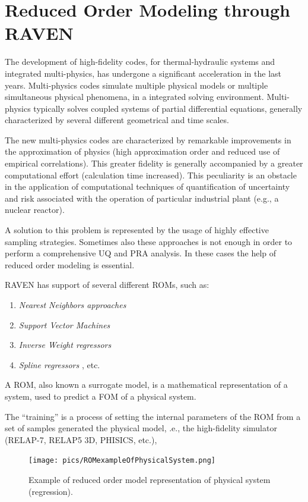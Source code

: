 \section{Reduced Order Modeling through RAVEN}
\label{sec:ROMraven}
The development of high-fidelity codes, for thermal-hydraulic systems
and integrated multi-physics, has undergone a significant acceleration
in the last years. Multi-physics codes simulate
multiple physical models or multiple simultaneous physical phenomena,
in a integrated solving environment. Multi-physics typically
solves coupled systems of partial differential equations, generally
characterized by several different geometrical and time scales.

The new multi-physics codes are characterized by remarkable
improvements
in the approximation of physics (high approximation order and reduced
use of empirical correlations). This greater fidelity is generally
accompanied by a greater computational effort (calculation time
increased). This peculiarity is an
obstacle in the application of  computational techniques of
quantification of uncertainty and risk associated with the operation of
particular industrial plant (e.g., a nuclear reactor).

A solution to this problem is represented by the
usage
of highly effective sampling strategies. Sometimes also these
approaches is not enough
in order to perform a comprehensive UQ and PRA analysis. In these
cases the help of reduced order modeling is essential.

RAVEN has support of several different ROMs,
such as:
\begin{enumerate}
  \item \textit{Nearest Neighbors approaches}
  \item \textit{Support Vector Machines}
  \item \textit{Inverse Weight regressors}
  \item \textit{Spline regressors }, etc.
\end{enumerate}

A ROM, also known a surrogate
model, is a mathematical representation of a system, used to predict
a FOM of a physical system.

The ``training'' is a process of setting the internal parameters of the ROM from a set
of samples generated the physical model, .e.,
 the high-fidelity simulator (RELAP-7, RELAP5
3D, PHISICS, etc.),
\begin{figure}[h!]
  \centering
  \texttt{[image: pics/ROMexampleOfPhysicalSystem.png]}
  \caption{Example of reduced order model representation of physical system (regression).}
  \label{fig:ROMexampleOfPhysicalSystem}
\end{figure}


